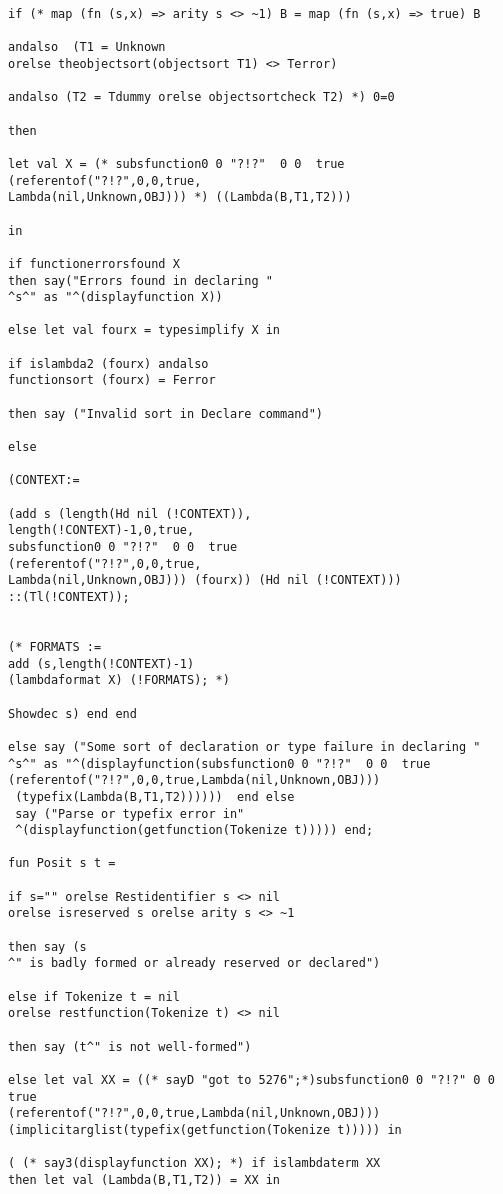 \documentclass[12pt]{article}
\begin{document}
\begin{verbatim}
if (* map (fn (s,x) => arity s <> ~1) B = map (fn (s,x) => true) B

andalso  (T1 = Unknown 
orelse theobjectsort(objectsort T1) <> Terror)

andalso (T2 = Tdummy orelse objectsortcheck T2) *) 0=0

then 

let val X = (* subsfunction0 0 "?!?"  0 0  true 
(referentof("?!?",0,0,true,
Lambda(nil,Unknown,OBJ))) *) ((Lambda(B,T1,T2)))

in

if functionerrorsfound X 
then say("Errors found in declaring "
^s^" as "^(displayfunction X))

else let val fourx = typesimplify X in

if islambda2 (fourx) andalso 
functionsort (fourx) = Ferror

then say ("Invalid sort in Declare command")

else

(CONTEXT:=

(add s (length(Hd nil (!CONTEXT)),
length(!CONTEXT)-1,0,true,
subsfunction0 0 "?!?"  0 0  true 
(referentof("?!?",0,0,true,
Lambda(nil,Unknown,OBJ))) (fourx)) (Hd nil (!CONTEXT)))
::(Tl(!CONTEXT));


(* FORMATS := 
add (s,length(!CONTEXT)-1) 
(lambdaformat X) (!FORMATS); *)

Showdec s) end end

else say ("Some sort of declaration or type failure in declaring "
^s^" as "^(displayfunction(subsfunction0 0 "?!?"  0 0  true 
(referentof("?!?",0,0,true,Lambda(nil,Unknown,OBJ)))
 (typefix(Lambda(B,T1,T2))))))  end else 
 say ("Parse or typefix error in"
 ^(displayfunction(getfunction(Tokenize t))))) end;

fun Posit s t =

if s="" orelse Restidentifier s <> nil 
orelse isreserved s orelse arity s <> ~1

then say (s
^" is badly formed or already reserved or declared")

else if Tokenize t = nil 
orelse restfunction(Tokenize t) <> nil

then say (t^" is not well-formed")

else let val XX = ((* sayD "got to 5276";*)subsfunction0 0 "?!?" 0 0 true 
(referentof("?!?",0,0,true,Lambda(nil,Unknown,OBJ)))
(implicitarglist(typefix(getfunction(Tokenize t))))) in

( (* say3(displayfunction XX); *) if islambdaterm XX 
then let val (Lambda(B,T1,T2)) = XX in


\end{verbatim}
\end{document}
